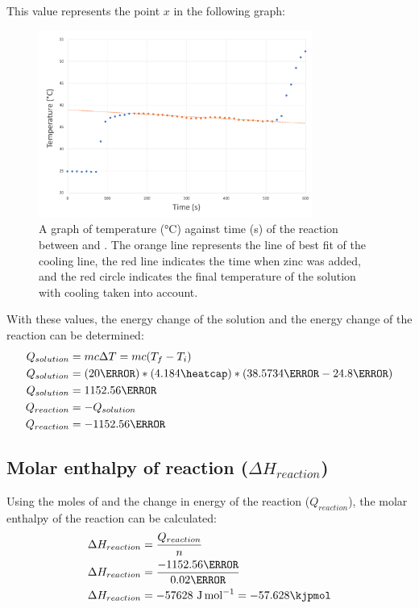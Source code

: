 \documentclass[12pt, notitlepage, letterpaper]{report}
\begin{document}
This value represents the point $x$ in the following graph:

\begin{figure}[h!]
	\caption{A graph of temperature (\unit{\celsius}) against time (\unit{\second}) of the reaction between  and . The orange line represents the line of best fit of the cooling line, the red line indicates the time when zinc was added, and the red circle indicates the final temperature of the solution with cooling taken into account.}
	\centerline{\noindent\includegraphics[width=0.8\textwidth]{time-vs-temperature.png}}
\end{figure}

With these values, the energy change of the solution and the energy change of the reaction can be determined:
\begin{align*}
	Q_{solution} & = mc\Delta T = mc(T_f - T_i)
	\\
	Q_{solution} & = (20\gram) * (4.184\heatcap) * (38.5734\celsius - 24.8\celsius)
	\\
	Q_{solution} & = 1152.56\joule
	\\
	Q_{reaction} & = -Q_{solution}
	\\
	Q_{reaction} & = -1152.56\joule
\end{align*}

\subsection*{Molar enthalpy of reaction ($\Delta H_{reaction}$)}

Using the moles of  and the change in energy of the reaction ($Q_{reaction}$), the molar enthalpy of the reaction can be calculated:
\begin{align*}
	\Delta H_{reaction} & = \frac{Q_{reaction}}{n}                        \\
	\Delta H_{reaction} & = \frac{-1152.56\joule}{0.02\mol}               \\
	\Delta H_{reaction} & = -57628~\unit{\joule\per\mol} = -57.628\kjpmol
\end{align*}
\end{document}
